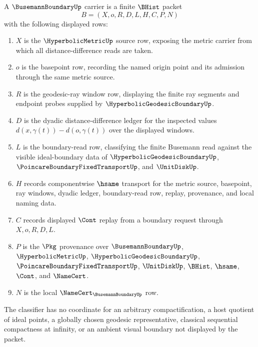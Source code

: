 \begin{definition}
\label{def:busemann-boundary-carrier}
A $\BusemannBoundaryUp$ carrier is a finite $\BHist$ packet
$$
B=(X,o,R,D,L,H,C,P,N)
$$
with the following displayed rows:
\begin{enumerate}
\item $X$ is the $\HyperbolicMetricUp$ source row, exposing the metric carrier from which all distance-difference reads are taken.
\item $o$ is the basepoint row, recording the named origin point and its admission through the same metric source.
\item $R$ is the geodesic-ray window row, displaying the finite ray segments and endpoint probes supplied by $\HyperbolicGeodesicBoundaryUp$.
\item $D$ is the dyadic distance-difference ledger for the inspected values $d(x,\gamma(t))-d(o,\gamma(t))$ over the displayed windows.
\item $L$ is the boundary-read row, classifying the finite Busemann read against the visible ideal-boundary data of $\HyperbolicGeodesicBoundaryUp$, $\PoincareBoundaryFixedTransportUp$, and $\UnitDiskUp$.
\item $H$ records componentwise $\hsame$ transport for the metric source, basepoint, ray windows, dyadic ledger, boundary-read row, replay, provenance, and local naming data.
\item $C$ records displayed $\Cont$ replay from a boundary request through $X,o,R,D,L$.
\item $P$ is the $\Pkg$ provenance over $\BusemannBoundaryUp$, $\HyperbolicMetricUp$, $\HyperbolicGeodesicBoundaryUp$, $\PoincareBoundaryFixedTransportUp$, $\UnitDiskUp$, $\BHist$, $\hsame$, $\Cont$, and $\NameCert$.
\item $N$ is the local $\NameCert_{\BusemannBoundaryUp}$ row.
\end{enumerate}
The classifier has no coordinate for an arbitrary compactification, a host quotient of ideal points, a globally chosen geodesic representative, classical sequential compactness at infinity, or an ambient visual boundary not displayed by the packet.
\end{definition}

